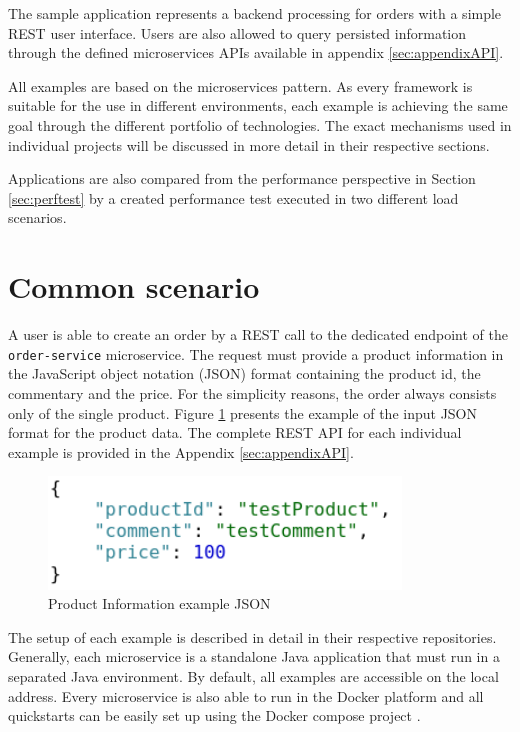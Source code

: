 \documentclass[oneside,
  digital, %
  table,   %
  lof,     %
  lot,     %
]{fithesis3}
\begin{document}
The sample application represents a backend processing for orders with a simple REST user interface. Users are also allowed to query persisted information through the defined microservices APIs available in appendix \ref{sec:appendixAPI}.

All examples are based on the microservices pattern. As every framework is suitable for the use in different environments, each example is achieving the same goal through the different portfolio of technologies. The exact mechanisms used in individual projects will be discussed in more detail in their respective sections.

Applications are also compared from the performance perspective in Section \ref{sec:perftest} by a created performance test executed in two different load scenarios.

\section{Common scenario}

A user is able to create an order by a REST call to the dedicated endpoint of the \texttt{order-service} microservice. The request must provide a product information in the JavaScript object notation (JSON) format containing the product id, the commentary and the price. For the simplicity reasons, the order always consists only of the single product. Figure \ref{fig:inputJson} presents the example of the input JSON format for the product data. The complete REST API for each individual example is provided in the Appendix \ref{sec:appendixAPI}.

\begin{figure}
    \begin{center}
        \includegraphics[height=30mm]{images/productInfoJSON.png}
    \end{center}
    \caption{Product Information example JSON}
    \label{fig:inputJson}
\end{figure}

The setup of each example is described in detail in their respective repositories. Generally, each microservice is a standalone Java application that must run in a separated Java environment. By default, all examples are accessible on the local address. Every microservice is also able to run in the Docker \cite{docker} platform and all quickstarts can be easily set up using the Docker compose project \cite{docker_compose}.
\end{document}

